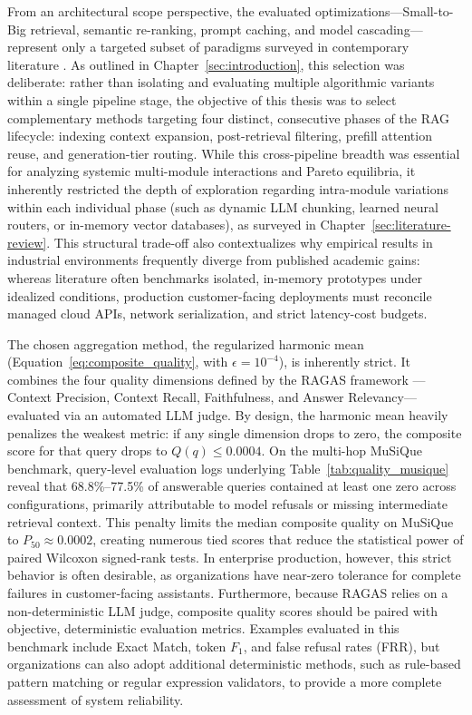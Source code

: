 From an architectural scope perspective, the evaluated optimizations---Small-to-Big retrieval, semantic re-ranking, prompt caching, and model cascading---represent only a targeted subset of paradigms surveyed in contemporary literature \citep{gao2023retrieval, wu2025ragnlp, gan2025rag}. As outlined in Chapter~\ref{sec:introduction}, this selection was deliberate: rather than isolating and evaluating multiple algorithmic variants within a single pipeline stage, the objective of this thesis was to select complementary methods targeting four distinct, consecutive phases of the RAG lifecycle: indexing context expansion, post-retrieval filtering, prefill attention reuse, and generation-tier routing. While this cross-pipeline breadth was essential for analyzing systemic multi-module interactions and Pareto equilibria, it inherently restricted the depth of exploration regarding intra-module variations within each individual phase (such as dynamic LLM chunking, learned neural routers, or in-memory vector databases), as surveyed in Chapter~\ref{sec:literature-review}. This structural trade-off also contextualizes why empirical results in industrial environments frequently diverge from published academic gains: whereas literature often benchmarks isolated, in-memory prototypes under idealized conditions, production customer-facing deployments must reconcile managed cloud APIs, network serialization, and strict latency-cost budgets.

The chosen aggregation method, the regularized harmonic mean (Equation~\ref{eq:composite_quality}, with $\epsilon = 10^{-4}$), is inherently strict. It combines the four quality dimensions defined by the RAGAS framework \citep{es2024ragas}---Context Precision, Context Recall, Faithfulness, and Answer Relevancy---evaluated via an automated LLM judge. By design, the harmonic mean heavily penalizes the weakest metric: if any single dimension drops to zero, the composite score for that query drops to $Q(q) \le 0.0004$. On the multi-hop MuSiQue benchmark, query-level evaluation logs underlying Table~\ref{tab:quality_musique} reveal that 68.8\%--77.5\% of answerable queries contained at least one zero across configurations, primarily attributable to model refusals or missing intermediate retrieval context. This penalty limits the median composite quality on MuSiQue to $P_{50} \approx 0.0002$, creating numerous tied scores that reduce the statistical power of paired Wilcoxon signed-rank tests. In enterprise production, however, this strict behavior is often desirable, as organizations have near-zero tolerance for complete failures in customer-facing assistants. Furthermore, because RAGAS relies on a non-deterministic LLM judge, composite quality scores should be paired with objective, deterministic evaluation metrics. Examples evaluated in this benchmark include Exact Match, token $F_1$, and false refusal rates (FRR), but organizations can also adopt additional deterministic methods, such as rule-based pattern matching or regular expression validators, to provide a more complete assessment of system reliability.

